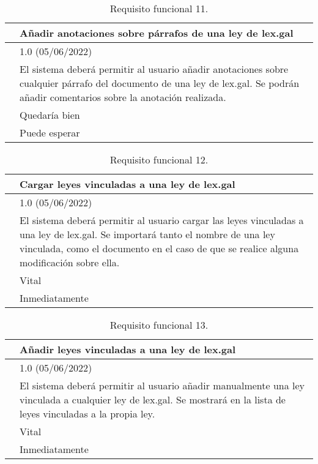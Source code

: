 \begin{table}[H]
\begin{center}
\begin{tabular}{|p{3cm}|p{10cm}|} \hline
\centering {\bf FRQ-11} & Añadir anotaciones sobre párrafos de una ley de lex.gal  \\ \hline\hline
\centering {\bf Versión} & 1.0 (05/06/2022) \\ \hline
\centering {\bf Descripción} & El sistema deberá permitir al usuario añadir anotaciones sobre cualquier párrafo del documento de una ley de lex.gal. Se podrán añadir comentarios sobre la anotación realizada. \\ \hline
\centering {\bf Importancia} & Quedaría bien \\ \hline
\centering {\bf Urgencia} & Puede esperar \\ \hline
\end{tabular}
\caption{Requisito funcional 11.}
\label{enlaceFRQ11}
\end{center}
\end{table}

\begin{table}[H]
\begin{center}
\begin{tabular}{|p{3cm}|p{10cm}|} \hline
\centering {\bf FRQ-12} & Cargar leyes vinculadas a una ley de lex.gal  \\ \hline\hline
\centering {\bf Versión} & 1.0 (05/06/2022) \\ \hline
\centering {\bf Descripción} & El sistema deberá permitir al usuario cargar las leyes vinculadas a una ley de lex.gal. Se importará tanto el nombre de una ley vinculada, como el documento en el caso de que se realice alguna modificación sobre ella. \\ \hline
\centering {\bf Importancia} & Vital \\ \hline
\centering {\bf Urgencia} & Inmediatamente \\ \hline
\end{tabular}
\caption{Requisito funcional 12.}
\label{enlaceFRQ12}
\end{center}
\end{table}

\begin{table}[H]
\begin{center}
\begin{tabular}{|p{3cm}|p{10cm}|} \hline
\centering {\bf FRQ-13} & Añadir leyes vinculadas a una ley de lex.gal  \\ \hline\hline
\centering {\bf Versión} & 1.0 (05/06/2022) \\ \hline
\centering {\bf Descripción} & El sistema deberá permitir al usuario añadir manualmente una ley vinculada a cualquier ley de lex.gal. Se mostrará en la lista de leyes vinculadas a la propia ley. \\ \hline
\centering {\bf Importancia} & Vital \\ \hline
\centering {\bf Urgencia} & Inmediatamente \\ \hline
\end{tabular}
\caption{Requisito funcional 13.}
\label{enlaceFRQ13}
\end{center}
\end{table}

